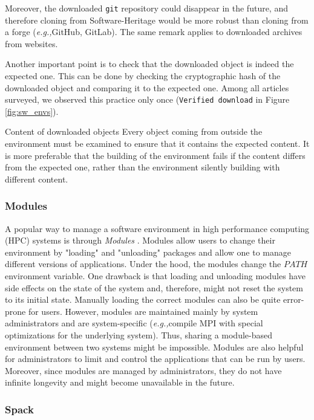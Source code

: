 \documentclass[sigconf,natbib=false]{acmart}
\newcommand{\eg}{\emph{e.g.,}}
\newcommand{\todo}[1]{{\color{red}{TODO: #1}}}
\begin{document}
Moreover, the downloaded \texttt{git} repository could disappear in the future, and therefore cloning from Software-Heritage would be more robust than cloning from a forge (\eg GitHub, GitLab).
The same remark applies to downloaded archives from websites.

Another important point is to check that the downloaded object is indeed the expected one.
This can be done by checking the cryptographic hash of the downloaded object and comparing it to the expected one.
Among all articles surveyed, we observed this practice only once (\texttt{Verified download} in Figure \ref{fig:sw_envs}).

\begin{lesson}{Content of downloaded objects}{}
Every object coming from outside the environment must be examined to ensure that it contains the expected content.
It is more preferable that the building of the environment fails if the content differs from the expected one, rather than the environment silently building with different content.
\end{lesson}

\subsubsection{Modules}

A popular way to manage a software environment in high performance computing (HPC) systems is through \emph{Modules} \cite{furlani1991modules, modules}.
Modules allow users to change their environment by "loading" and "unloading" packages and allow one to manage different versions of applications. 
Under the hood, the modules change the \texttt{$PATH$} environment variable.
One drawback is that loading and unloading modules have side effects on the state of the system and, therefore, might not reset the system to its initial state.
Manually loading the correct modules can also be quite error-prone for users.
However, modules are maintained mainly by system administrators and are system-specific (\eg compile MPI with special optimizations for the underlying system).
Thus, sharing a module-based environment between two systems might be impossible.
Modules are also helpful for administrators to limit and control the applications that can be run by users.
Moreover, since modules are managed by administrators, they do not have infinite longevity and might become unavailable in the future.

\subsubsection{Spack}
\end{document}
